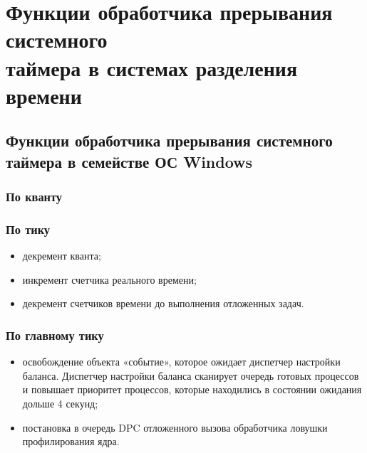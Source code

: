 \chapter{Функции обработчика прерывания системного \\ таймера в системах разделения времени}

\section{Функции обработчика прерывания системного \\ таймера в семействе ОС Windows}

\subsection*{По кванту}


\subsection*{По тику}

\begin{itemize}[label*=--]
	\item декремент кванта;
	\item  инкремент счетчика реального времени;
	\item декремент счетчиков времени до выполнения отложенных задач.
\end{itemize}

\subsection*{По главному тику}

\begin{itemize}[label*=--]
	\item освобождение объекта «событие», которое ожидает диспетчер настройки баланса. Диспетчер настройки баланса сканирует очередь готовых процессов и повышает приоритет процессов, которые находились в состоянии ожидания дольше 4 секунд;
	\item постановка в очередь DPC отложенного вызова обработчика ловушки профилирования ядра.
\end{itemize}

\clearpage

